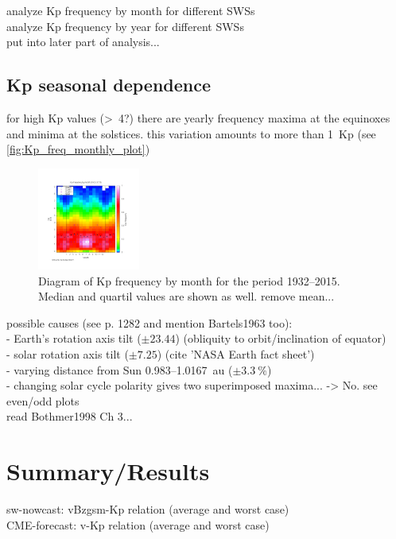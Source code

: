 analyze Kp frequency by month for different SWSs\\
analyze Kp frequency by year for different SWSs\\
put into later part of analysis...

\subsection{Kp seasonal dependence}
for high Kp values (>~4?) there are yearly frequency maxima at the equinoxes and minima at the solstices. this variation amounts to more than 1~Kp (see \autoref{fig:Kp_freq_monthly_plot})
\begin{figure}[htb]
	\centering
	\includegraphics[width=0.3\textwidth]{images/gnuplots/Kp_freq_monthly_plot.png}
	\caption{Diagram of Kp frequency by month for the period 1932--2015. Median and quartil values are shown as well. remove mean...}
	\label{fig:Kp_freq_monthly_plot}
\end{figure}

possible causes (see \citet{Rangarajan1997} p. 1282 and mention Bartels1963 too):\\
- Earth's rotation axis tilt ($\pm23.44$\textdegree) (obliquity to orbit/inclination of equator)\\
- solar rotation axis tilt ($\pm7.25$\textdegree) (cite 'NASA Earth fact sheet')\\
- varying distance from Sun 0.983--1.0167~au ($\pm3.3~\%$)\\
- changing solar cycle polarity gives two superimposed maxima... -> No. see even/odd plots\\

read Bothmer1998 Ch 3...\\


\section{Summary/Results}
sw-nowcast: vBzgsm-Kp relation (average and worst case)\\
CME-forecast: v-Kp relation (average and worst case)\\

